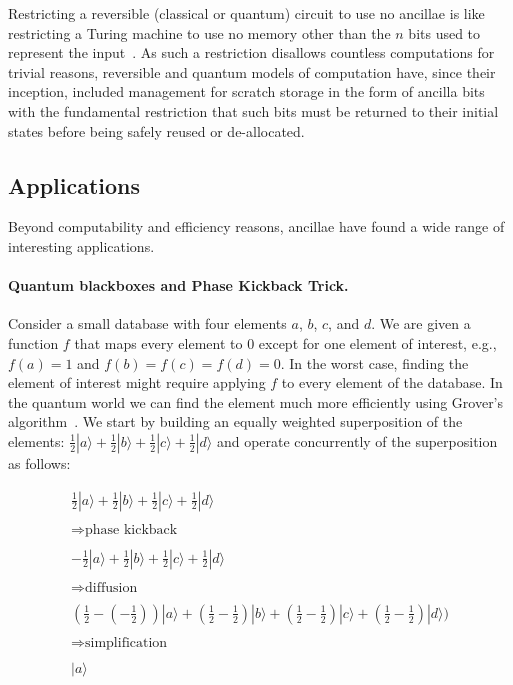 \documentclass[sigplan,10pt,review,anonymous]{acmart}
\newcommand{\ket}[1]{|#1\rangle}
\begin{document}
Restricting a reversible (classical or quantum) circuit to use no
ancillae is like restricting a Turing machine to use no memory other
than the $n$ bits used to represent the
input~\cite{DBLP:conf/innovations/AaronsonGS17}. As such a restriction
disallows countless computations for trivial reasons, reversible and
quantum models of computation have, since their inception, included
management for scratch storage in the form of ancilla
bits~\cite{Toffoli:1980} with the fundamental restriction that such
bits must be returned to their initial states before being safely
reused or de-allocated.

\subsection{Applications}
 
Beyond computability and efficiency reasons, ancillae have found a
wide range of interesting applications. 

\paragraph*{Quantum blackboxes and Phase Kickback Trick.} Consider a
small database with four elements $a$, $b$, $c$, and $d$. We are given
a function $f$ that maps every element to $0$ except for one element
of interest, e.g., $f(a)=1$ and $f(b)=f(c)=f(d)=0$. In the worst case,
finding the element of interest might require applying $f$ to every
element of the database. In the quantum world we can find the element
much more efficiently using Grover's
algorithm~\cite{Grover:1996:FQM:237814.237866}. We start by building
an equally weighted superposition of the elements:
$\frac{1}{2}\ket{a}+\frac{1}{2}\ket{b}+\frac{1}{2}\ket{c}+\frac{1}{2}\ket{d}$
and operate concurrently of the superposition as follows:

\[\begin{array}{l}
                    \frac{1}{2}\ket{a}+\frac{1}{2}\ket{b}+\frac{1}{2}\ket{c}+\frac{1}{2}\ket{d}\\
\\
\Rightarrow  \textrm{phase kickback} \\
\\
-\frac{1}{2}\ket{a}+\frac{1}{2}\ket{b}+\frac{1}{2}\ket{c}+\frac{1}{2}\ket{d}\\
\\
\Rightarrow  \textrm{diffusion} \\
\\
 (\frac{1}{2}-(-\frac{1}{2}))\ket{a}+(\frac{1}{2}-\frac{1}{2})\ket{b}+(\frac{1}{2}-\frac{1}{2})\ket{c}+(\frac{1}{2}-\frac{1}{2})\ket{d})\\
\\
\Rightarrow  \textrm{simplification} \\
\\
\ket{a}
\end{array}\]
\end{document}
